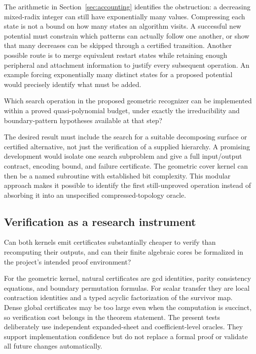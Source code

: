 The arithmetic in Section~\ref{sec:accounting} identifies the obstruction:
a decreasing mixed-radix integer can still have exponentially many
values. Compressing each state is not a bound on how many states an
algorithm visits. A successful new potential must constrain which
patterns can actually follow one another, or show that many decreases
can be skipped through a certified transition. Another possible route is
to merge equivalent restart states while retaining enough peripheral and
attachment information to justify every subsequent operation. An
example forcing exponentially many distinct states for a proposed
potential would precisely identify what must be added.

\begin{researchquestion}
Which search operation in the proposed geometric recognizer can be
implemented within a proved quasi-polynomial budget, under exactly the
irreducibility and boundary-pattern hypotheses available at that step?
\end{researchquestion}

The desired result must include the search for a suitable decomposing
surface or certified alternative, not just the verification of a supplied
hierarchy. A promising development would isolate one search subproblem
and give a full input/output contract, encoding bound, and failure
certificate. The geometric cover kernel can then be a named subroutine
with established bit complexity. This modular approach makes it possible
to identify the first still-unproved operation instead of absorbing it
into an unspecified compressed-topology oracle.

\subsection{Verification as a research instrument}

\begin{researchquestion}
Can both kernels emit certificates substantially cheaper to verify than
recomputing their outputs, and can their finite algebraic cores be
formalized in the project's intended proof environment?
\end{researchquestion}

For the geometric kernel, natural certificates are gcd identities,
parity consistency equations, and boundary permutation formulas. For
scalar transfer they are local contraction identities and a typed
acyclic factorization of the survivor map. Dense global certificates may
be too large even when the computation is succinct, so verification cost
belongs in the theorem statement. The present tests deliberately use
independent expanded-sheet and coefficient-level oracles. They support
implementation confidence but do not replace a formal proof or validate
all future changes automatically.

